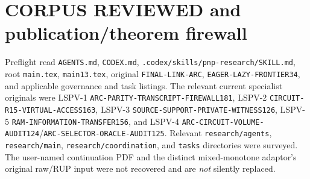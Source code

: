 \documentclass[11pt]{article}
\begin{document}
\section{CORPUS REVIEWED and publication/theorem firewall}
Preflight read \texttt{AGENTS.md}, \texttt{CODEX.md}, \texttt{.codex/skills/pnp-research/SKILL.md}, root \texttt{main.tex}, \texttt{main13.tex}, original \texttt{FINAL-LINK-ARC}, \texttt{EAGER-LAZY-FRONTIER34}, and applicable governance and task listings. The relevant current specialist originals were LSPV-1 \texttt{ARC-PARITY-TRANSCRIPT-FIREWALL181}, LSPV-2 \texttt{CIRCUIT-R15-VIRTUAL-ACCESS163}, LSPV-3 \texttt{SOURCE-SUPPORT-PRIVATE-WITNESS126}, LSPV-5 \texttt{RAM-INFORMATION-TRANSFER156}, and LSPV-4 \texttt{ARC-CIRCUIT-VOLUME-AUDIT124}/\texttt{ARC-SELECTOR-ORACLE-AUDIT125}. Relevant \texttt{research/agents}, \texttt{research/main}, \texttt{research/coordination}, and \texttt{tasks} directories were surveyed. The user-named continuation PDF and the distinct mixed-monotone adaptor's original raw/RUP input were not recovered and are \emph{not} silently replaced.
\end{document}
